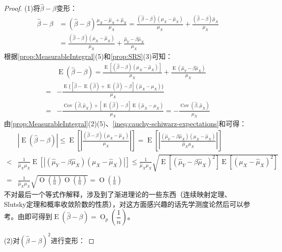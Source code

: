 \begin{proof}
	(1)将$\hat{\beta}-\beta$变形：
	\begin{align*}
		\hat{\beta}-\beta&=(\hat{\beta}-\beta)\frac{\mu_X-\hat{\mu}_X+\hat{\mu}_X}{\mu_X}=\frac{(\hat{\beta}-\beta)(\mu_X-\hat{\mu}_X)}{\mu_X}+\frac{(\hat{\beta}-\beta)\hat{\mu}_X}{\mu_X} \\
		&=\frac{(\hat{\beta}-\beta)(\mu_X-\hat{\mu}_X)}{\mu_X}+\frac{\hat{\mu}_Y-\beta\hat{\mu}_X}{\mu_X}
	\end{align*}
	根据\cref{prop:MeasurableIntegral}(5)和\cref{prop:SRS}(3)可知：
	\begin{align*}
		&\operatorname{E}(\hat{\beta}-\beta)=\frac{\operatorname{E}[(\hat{\beta}-\beta)(\mu_X-\hat{\mu}_X)]}{\mu_X}+\frac{\operatorname{E}(\hat{\mu}_Y-\beta\hat{\mu}_X)}{\mu_X} \\
		=&-\frac{\operatorname{E}\{[\hat{\beta}-\operatorname{E}(\hat{\beta})+\operatorname{E}(\hat{\beta})-\beta](\hat{\mu}_X-\mu_X)\}}{\mu_X} \\
		=&-\frac{\operatorname{Cov}(\hat{\beta},\hat{\mu}_X)+[\operatorname{E}(\hat{\beta})-\beta]\operatorname{E}(\hat{\mu}_X-\mu_X)}{\mu_X}=-\frac{\operatorname{Cov}(\hat{\beta},\hat{\mu}_X)}{\mu_X}
	\end{align*}
	由\cref{prop:MeasurableIntegral}(2)(5)、\cref{ineq:cauchy-schiwarz-expectations}和可得：
	\begin{align*}
		&|\operatorname{E}(\hat{\beta}-\beta)|\leqslant\operatorname{E}\left[\left|\frac{(\hat{\beta}-\beta)(\mu_X-\hat{\mu}_X)}{\mu_X}\right|\right]=\operatorname{E}\left[\left|\frac{(\hat{\mu}_Y-\beta\hat{\mu}_X)(\mu_X-\hat{\mu}_X)}{\hat{\mu}_X\mu_X}\right|\right] \\
		<&\frac{1}{\hat{\mu}_X\mu_X}\operatorname{E}[|(\hat{\mu}_Y-\beta\hat{\mu}_X)(\mu_X-\hat{\mu}_X)|]\leqslant\frac{1}{\hat{\mu}_X\mu_X}\sqrt{\operatorname{E}[(\hat{\mu}_Y-\beta\hat{\mu}_X)^2]\operatorname{E}[(\mu_X-\hat{\mu}_X)^2]} \\
		=&\frac{1}{\hat{\mu}_X\mu_X}\sqrt{\operatorname{O}\left(\frac{1}{n}\right)\operatorname{O}\left(\frac{1}{n}\right)}=\operatorname{O}\left(\frac{1}{n}\right)
	\end{align*}
	不对最后一个等式作解释，涉及到了渐进理论的一些东西（连续映射定理、Slutsky定理和概率收敛阶数的性质），对这方面感兴趣的话先学测度论然后可以参考\cite{vander}。由即可得到$\operatorname{E}(\hat{\beta}-\beta)=\operatorname{O}_p\left(\dfrac{1}{n}\right)$。\par
	(2)对$(\hat{\beta}-\beta)^2$进行变形：

\end{proof}
